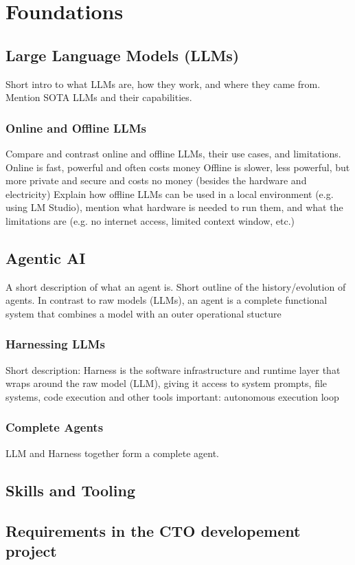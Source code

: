 \section{Foundations} %
\label{sec:foundations}

\subsection{Large Language Models (LLMs)}
Short intro to what LLMs are, how they work, and where they came from. Mention SOTA LLMs and their capabilities. 
\subsubsection{Online and Offline LLMs}
Compare and contrast online and offline LLMs, their use cases, and limitations.
Online is fast, powerful and often costs money
Offline is slower, less powerful, but more private and secure and costs no money (besides the hardware and electricity)
Explain how offline LLMs can be used in a local environment (e.g. using LM Studio), mention what hardware is needed to run them, and what the limitations are (e.g. no internet access, limited context window, etc.)

\subsection{Agentic AI}
A short description of what an agent is. Short outline of the history/evolution of agents.
In contrast to raw models (LLMs), an agent is a complete functional system that combines a model with an outer operational stucture
\subsubsection{Harnessing LLMs}
Short description: Harness is the software infrastructure and runtime layer that wraps around the raw model (LLM), giving it access to system prompts, file systems, code execution and other tools
important: autonomous execution loop
\subsubsection{Complete Agents}
LLM and Harness together form a complete agent. 

\subsection{Skills and Tooling}

\subsection{Requirements in the CTO developement project}
